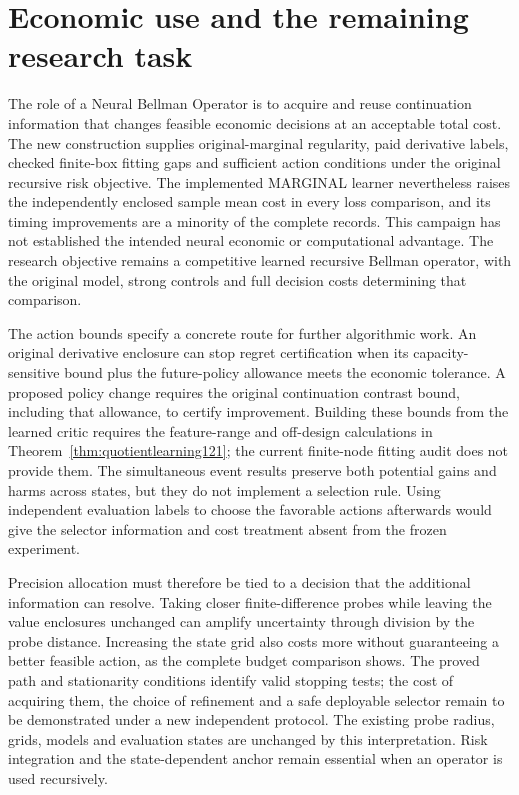 \section{Economic use and the remaining research task}
\label{sec:discussion121}

The role of a Neural Bellman Operator is to acquire and reuse continuation
information that changes feasible economic decisions at an acceptable total
cost. The new construction supplies original-marginal regularity, paid
derivative labels, checked finite-box fitting gaps and sufficient action
conditions under the original recursive risk objective. The implemented
MARGINAL learner nevertheless raises the independently enclosed sample mean
cost in every loss comparison, and its timing improvements are a minority of
the complete records. This campaign has not established the intended neural
economic or computational advantage. The research objective remains a
competitive learned recursive Bellman operator, with the original model,
strong controls and full decision costs determining that comparison.

The action bounds specify a concrete route for further algorithmic work.
An original derivative enclosure can stop regret certification when its
capacity-sensitive bound plus the future-policy allowance meets the economic
tolerance. A proposed policy change requires the original continuation
contrast bound, including that allowance, to certify improvement. Building
these bounds from the learned critic requires the feature-range and
off-design calculations in Theorem~\ref{thm:quotientlearning121}; the current
finite-node fitting audit does not provide them. The simultaneous event
results preserve both potential gains and harms across states, but they do
not implement a selection rule. Using independent evaluation labels to
choose the favorable actions afterwards would give the selector information
and cost treatment absent from the frozen experiment.

Precision allocation must therefore be tied to a decision that the additional
information can resolve. Taking closer finite-difference probes while leaving
the value enclosures unchanged can amplify uncertainty through division by
the probe distance. Increasing the state grid also costs more without
guaranteeing a better feasible action, as the complete budget comparison
shows. The proved path and stationarity conditions identify valid stopping
tests; the cost of acquiring them, the choice of refinement and a safe
deployable selector remain to be demonstrated under a new independent
protocol. The existing probe radius, grids, models and evaluation states
are unchanged by this interpretation. Risk integration and the
state-dependent anchor remain essential when an operator is used recursively.


